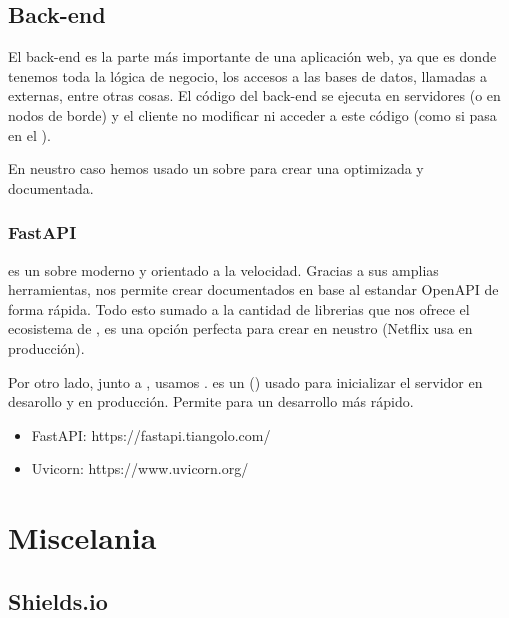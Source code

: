 \subsection{Back-end}

El back-end es la parte más importante de una aplicación web, ya que es donde tenemos toda la lógica de negocio, los accesos a las bases de datos, llamadas a  externas, entre otras cosas. El código del back-end se ejecuta en servidores (o en nodos de borde) y el cliente no modificar ni acceder a este código (como si pasa en el  ).

En neustro caso hemos usado un  sobre  para crear una  optimizada y documentada.

\subsubsection{FastAPI}

 es un  sobre  moderno y orientado a la velocidad. Gracias a sus amplias herramientas, nos permite crear  documentados en base al estandar OpenAPI de forma rápida. Todo esto sumado a la cantidad de librerias que nos ofrece el ecosistema de ,  es una opción perfecta para crear  en neustro  (Netflix usa  en producción).

Por otro lado, junto a , usamos .  es un  ()  usado para inicializar el servidor en desarollo y en producción. Permite  para un desarrollo más rápido.

\begin{itemize}
  \item FastAPI: https://fastapi.tiangolo.com/
  \item Uvicorn: https://www.uvicorn.org/
\end{itemize}


\section{Miscelania}

\subsection{Shields.io}

